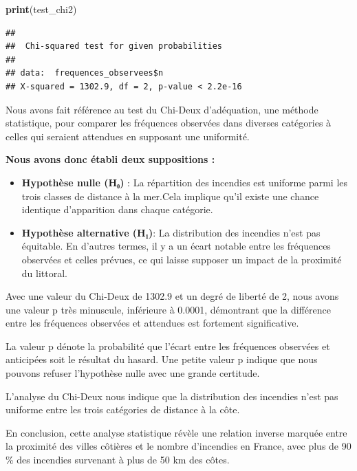 \documentclass[
]{article}
\newenvironment{Shaded}{\begin{snugshade}}{\end{snugshade}}
\newcommand{\FunctionTok}[1]{\textcolor[rgb]{0.13,0.29,0.53}{\textbf{#1}}}
\newcommand{\NormalTok}[1]{#1}
\begin{document}
\begin{Shaded}
\begin{Highlighting}[]
\FunctionTok{print}\NormalTok{(test\_chi2)}
\end{Highlighting}
\end{Shaded}

\begin{verbatim}
## 
##  Chi-squared test for given probabilities
## 
## data:  frequences_observees$n
## X-squared = 1302.9, df = 2, p-value < 2.2e-16
\end{verbatim}

Nous avons fait référence au test du Chi-Deux d'adéquation, une méthode
statistique, pour comparer les fréquences observées dans diverses
catégories à celles qui seraient attendues en supposant une uniformité.

\textbf{Nous avons donc établi deux suppositions :}

\begin{itemize}
\item
  \textbf{Hypothèse nulle (H₀) }: La répartition des incendies est
  uniforme parmi les trois classes de distance à la mer.Cela implique
  qu'il existe une chance identique d'apparition dans chaque catégorie.
\item
  \textbf{Hypothèse alternative (H₁)}: La distribution des incendies
  n'est pas équitable. En d'autres termes, il y a un écart notable entre
  les fréquences observées et celles prévues, ce qui laisse supposer un
  impact de la proximité du littoral.
\end{itemize}

Avec une valeur du Chi-Deux de 1302.9 et un degré de liberté de 2, nous
avons une valeur p très minuscule, inférieure à 0.0001, démontrant que
la différence entre les fréquences observées et attendues est fortement
significative.

La valeur p dénote la probabilité que l'écart entre les fréquences
observées et anticipées soit le résultat du hasard. Une petite valeur p
indique que nous pouvons refuser l'hypothèse nulle avec une grande
certitude.

L'analyse du Chi-Deux nous indique que la distribution des incendies
n'est pas uniforme entre les trois catégories de distance à la côte.

En conclusion, cette analyse statistique révèle une relation inverse
marquée entre la proximité des villes côtières et le nombre d'incendies
en France, avec plus de 90 \% des incendies survenant à plus de 50 km
des côtes.
\end{document}

